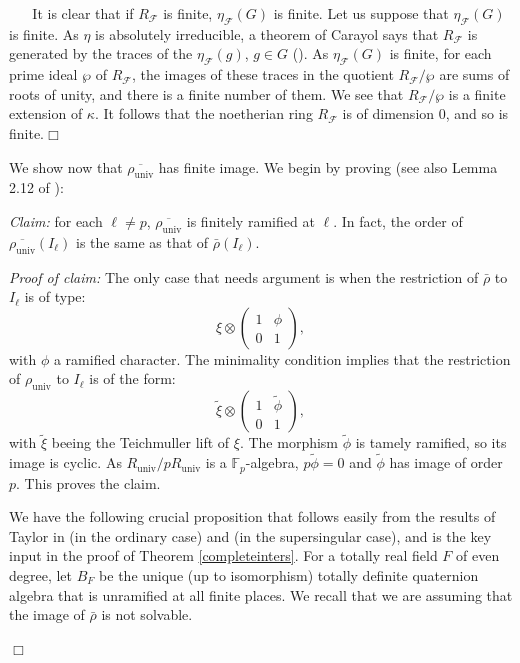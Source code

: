 \documentclass[12pt]{article}
\newcommand{\rhobar}{\overline{\rho}}
\newenvironment{proof}{\smallskip\noindent{\bf Proof.}\
}{$\Box$\smallskip\goodbreak}
\def\rhobar{ {\bar {\rho} } }
\def\rhob{ {\bar {\rho} } }
\newcommand{\F}{{\mathbb F}}
\begin{document}
\begin{proof}
\begin{proof} It is clear that if $R_{\mathcal{F}}$
is finite,  $\eta_{\mathcal{F}} (G )$ is finite.
Let us suppose that $\eta _{\mathcal{F}}(G )$ is finite. As
$\eta$ is absolutely irreducible, a theorem of Carayol
says that $R_{\mathcal{F}}$ is generated by the traces of
the $\eta_{\mathcal{F}}(g)$, $g\in G$ (\cite{[C94]}).
As $\eta _{\mathcal{F}}(G )$ is finite,
for each prime ideal $\wp$ of $R_{\mathcal{F}}$,
the images of these traces in
the quotient $R_{\mathcal{F}}/ \wp$
are sums of roots of unity, and  there is a finite number of them.
We see that  $R_{\mathcal{F}}/ \wp$ is a finite extension of
$\kappa$. It follows that the noetherian ring
$R_{\mathcal{F}}$ is of dimension $0$, and so is finite.\end{proof}


We show now that
$\overline{\rho_{\mathrm{univ}}}$
has finite image.
We begin by proving (see also Lemma 2.12 of \cite{[dJ01]}):

{\it Claim:} for each $\ell\not= p$,
$\overline{\rho_{\mathrm{univ}}}$ is
finitely ramified at $\ell$. In fact, the order of
$\overline{\rho_{\mathrm{univ}}}(I_\ell)$ is the same as that of
$\rhobar(I_\ell)$.

{\it Proof of claim:}
The only case that needs argument is when
the restriction of $\rhobar$
to $I_{\ell}$ is of type:
$$ \xi \otimes \left( \begin{array}{cc}
     1 & \phi  \\
     0 & 1
 \end{array} \right),$$
with $\phi$ a ramified character. The minimality condition
implies that the restriction of  ${\rho}_{\mathrm{univ}}$
to $I_{\ell}$ is of the form:
$$ \tilde{\xi} \otimes \left( \begin{array}{cc}
     1 & \tilde{\phi}  \\
     0 & 1
 \end{array} \right),$$
with $\tilde{\xi}$ beeing the Teichmuller lift of $\xi$.
The morphism $\tilde{\phi}$ is tamely ramified, so its image is cyclic.
As $R_{\mathrm{univ}}/pR_{\mathrm{univ}}$ is a $\F_p$-algebra,  $p
\tilde{\phi}=0$ and
$\tilde{\phi}$ has image of order $p$. This proves the claim.

\vspace{3mm}

We have the following crucial proposition that follows easily from
the results of Taylor in \cite{[T02]} (in the ordinary case) and \cite{[T03]} (in
the supersingular case), and
is the key input in the proof of Theorem \ref{completeinters}.
For a totally real field $F$ of even degree, let $B_F$ be the unique  (up to
isomorphism) totally definite quaternion algebra that is unramified at
all finite places. We recall that we are assuming that the image of
$\rhob$ is not solvable.


\end{proof}
\end{document}
